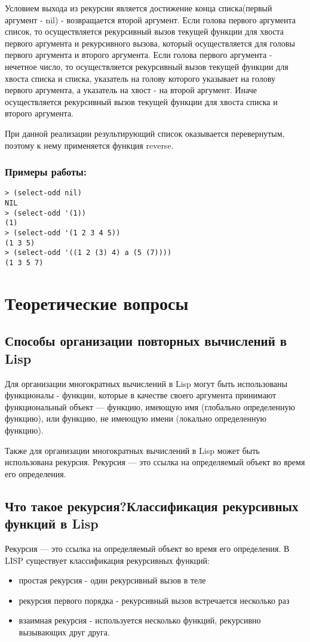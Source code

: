 \documentclass[a4paper,12pt]{article}
\begin{document}
Условием выхода из рекурсии является достижение конца списка(первый аргумент - nil) - возвращается второй аргумент. Если голова первого аргумента список, то осуществляется рекурсивный вызов текущей функции для хвоста первого аргумента и рекурсивного вызова, который осуществляется для головы первого аргумента и второго аргумента. Если голова первого аргумента - нечетное число, то осуществляется рекурсивный вызов текущей функции для хвоста списка и списка, указатель на голову которого указывает на голову первого аргумента, а указатель на хвост - на второй аргумент. Иначе осуществляется рекурсивный вызов текущей функции для хвоста списка и второго аргумента.

При данной реализации результирующий список оказывается перевернутым, поэтому к нему применяется функция reverse.

\subsubsection*{Примеры работы:}
\begin{lstlisting}
> (select-odd nil)
NIL
> (select-odd '(1))
(1)
> (select-odd '(1 2 3 4 5))
(1 3 5)
> (select-odd '((1 2 (3) 4) a (5 (7))))
(1 3 5 7)
\end{lstlisting}

\section*{Теоретические вопросы}
\subsection*{Способы организации повторных вычислений в Lisp}

Для организации многократных вычислений в Lisp могут быть использованы функционалы - функции, которые в качестве своего аргумента принимают функциональный объект — функцию, имеющую имя (глобально определенную функцию), или функцию, не имеющую имени (локально определенную функцию).

Также для организации многократных вычислений в Lisp может быть использована рекурсия. Рекурсия — это ссылка на определяемый объект во время его определения. 

\subsection*{Что такое рекурсия?Классификация рекурсивных функций в Lisp}

Рекурсия — это ссылка на определяемый объект во время его определения. 
В LISP существует классификация рекурсивных функций:
\begin{itemize}
	\item простая рекурсия - один рекурсивный вызов в теле
	\item рекурсия первого порядка - рекурсивный вызов встречается несколько раз
	\item взаимная рекурсия - используется несколько функций, рекурсивно вызывающих друг друга.
\end{itemize}
\end{document}
